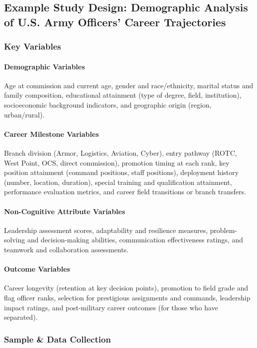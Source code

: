 \documentclass[../main.tex]{subfiles}
\begin{document}
\subsection{Example Study Design: Demographic Analysis of U.S. Army Officers' Career Trajectories}

\subsubsection{Key Variables}

\paragraph{Demographic Variables} Age at commission and current age, gender and race/ethnicity, marital status and family composition, educational attainment (type of degree, field, institution), socioeconomic background indicators, and geographic origin (region, urban/rural).

\paragraph{Career Milestone Variables} Branch division (Armor, Logistics, Aviation, Cyber), entry pathway (ROTC, West Point, OCS, direct commission), promotion timing at each rank, key position attainment (command positions, staff positions), deployment history (number, location, duration), special training and qualification attainment, performance evaluation metrics, and career field transitions or branch transfers.

\paragraph{Non-Cognitive Attribute Variables} Leadership assessment scores, adaptability and resilience measures, problem-solving and decision-making abilities, communication effectiveness ratings, and teamwork and collaboration assessments.

\paragraph{Outcome Variables} Career longevity (retention at key decision points), promotion to field grade and flag officer ranks, selection for prestigious assignments and commands, leadership impact ratings, and post-military career outcomes (for those who have separated).

\subsubsection{Sample \& Data Collection}
\end{document}
